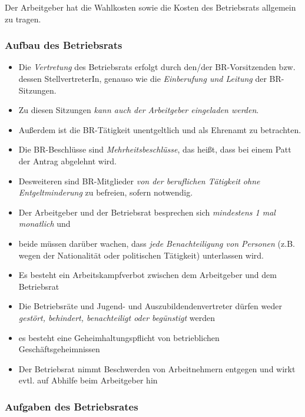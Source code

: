 \documentclass[a4paper, 12pt]{report}
\begin{document}
Der Arbeitgeber hat die Wahlkosten sowie die Kosten des Betriebsrats allgemein
zu tragen. \\

\subsubsection{Aufbau des Betriebsrats}

\begin{itemize}
    \item Die \emph{Vertretung} des Betriebsrats erfolgt durch den/der
	BR-Vorsitzenden bzw. dessen StellvertreterIn, genauso wie die
	\emph{Einberufung und Leitung} der BR-Sitzungen.
    \item Zu diesen Sitzungen \emph{kann auch der Arbeitgeber eingeladen
	werden}.
    \item Außerdem ist die BR-Tätigkeit unentgeltlich und als Ehrenamt zu
	betrachten.
    \item Die BR-Beschlüsse sind \emph{Mehrheitsbeschlüsse}, das heißt,
	dass bei einem Patt der Antrag abgelehnt wird.
    \item Desweiteren sind BR-Mitglieder \emph{von der beruflichen Tätigkeit
	ohne Entgeltminderung} zu befreien, sofern notwendig.
    \item Der Arbeitgeber und der Betriebsrat besprechen sich \emph{mindestens
	1 mal monatlich} und
    \item beide müssen darüber wachen, dass \emph{jede Benachteiligung von
	Personen} (z.B. wegen der Nationalität oder politischen Tätigkeit)
	unterlassen wird.
    \item Es besteht ein Arbeitskampfverbot zwischen dem Arbeitgeber und dem
	Betriebsrat
    \item Die Betriebsräte und Jugend- und Auszubildendenvertreter dürfen weder
	\emph{gestört, behindert, benachteiligt oder begünstigt} werden
    \item es besteht eine Geheimhaltungspflicht von betrieblichen
	Geschäftsgeheimnissen
    \item Der Betriebsrat nimmt Beschwerden von Arbeitnehmern entgegen und wirkt
	evtl. auf Abhilfe beim Arbeitgeber hin
\end{itemize}

\subsubsection{Aufgaben des Betriebsrates}
\end{document}

